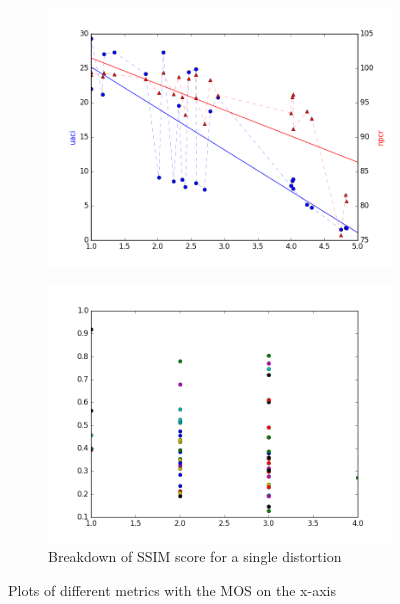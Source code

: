\documentclass{article}
\begin{document}
\begin{figure}[ht]
\begin{subfigure}{4.3cm}
  \includegraphics[width=1\linewidth]{figures/mos_npcr}
  \caption{}
  \label{fig:sub3}
\end{subfigure}%
\begin{subfigure}{4.3cm}
  \centering
  \includegraphics[width=1\linewidth]{figures/ssim_detail_11}
  \caption{Breakdown of SSIM score for a single distortion}
  \label{fig:sub4}
\end{subfigure}

\caption{Plots of different metrics with the MOS on the x-axis}
\label{fig:images}
\end{figure}
\end{document}
